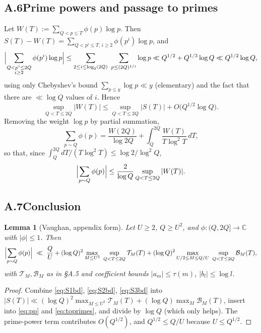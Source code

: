 \documentclass[11pt]{article}
\newtheorem{lemma}[theorem]{Lemma}
\theoremstyle{definition}
\theoremstyle{plain}
\begin{document}
\subsection*{A.6\quad Prime powers and passage to primes}

Let $W(T):=\sum_{Q<p\le T}\phi(p)\log p$.  Then
$S(T)-W(T)=\sum_{Q<p^{i}\le T,\,i\ge2}\phi(p^{i})\log p$, and
\[
\Bigl|\sum_{\substack{Q<p^{i}\le2Q\\ i\ge2}}\phi(p^{i})\log p\Bigr|
\le\sum_{2\le i\le\log_{2}(2Q)}\ \sum_{p\le(2Q)^{1/i}}\log p
\ll Q^{1/2}+Q^{1/3}\log Q\ll Q^{1/2}\log Q ,
\]
using only Chebyshev's bound $\sum_{p\le y}\log p\ll y$ (elementary) and
the fact that there are $\ll\log Q$ values of $i$.  Hence
\begin{equation}\label{eq:pp}
\sup_{Q<T\le2Q}|W(T)|\le\sup_{Q<T\le2Q}|S(T)|+O\bigl(Q^{1/2}\log Q\bigr).
\end{equation}
Removing the weight $\log p$ by partial summation,
\[
\sum_{p\sim Q}\phi(p)=\frac{W(2Q)}{\log 2Q}
+\int_{Q}^{2Q}\frac{W(T)}{T\log^{2}T}\,dT ,
\]
so that, since $\int_{Q}^{2Q}dT/(T\log^{2}T)\le\log2/\log^{2}Q$,
\begin{equation}\label{eq:toprimes}
\Bigl|\sum_{p\sim Q}\phi(p)\Bigr|
\le\frac{2}{\log Q}\sup_{Q<T\le2Q}|W(T)| .
\end{equation}

\subsection*{A.7\quad Conclusion}

\begin{lemma}[Vaughan, appendix form]\label{lem:vaughanA}
Let $U\ge2$, $Q\ge U^{2}$, and $\phi:(Q,2Q]\to\mathbb C$ with
$|\phi|\le1$.  Then
\[
\Bigl|\sum_{p\sim Q}\phi(p)\Bigr|
\ \ll\ \frac{Q}{U}
+(\log Q)^{2}\max_{M\le U^{2}}\ \sup_{Q<T\le2Q}\mathcal T_{M}(T)
+(\log Q)^{2}\max_{U/2\le M\le Q/U}\ \sup_{Q<T\le2Q}\mathcal B_{M}(T),
\]
with $\mathcal T_{M},\mathcal B_{M}$ as in \S A.5 and coefficient bounds
$|a_{m}|\le\tau(m)$, $|b_{l}|\le\log l$.
\end{lemma}

\begin{proof}
Combine \eqref{eq:S1bd}, \eqref{eq:S2bd}, \eqref{eq:S3bd} into
$|S(T)|\ll(\log Q)^{2}\max_{M\le U^{2}}\mathcal T_{M}(T)
+(\log Q)\max_{M}\mathcal B_{M}(T)$, insert into \eqref{eq:pp} and
\eqref{eq:toprimes}, and divide by $\log Q$ (which only helps).  The
prime-power term contributes $O(Q^{1/2})$, and $Q^{1/2}\le Q/U$ because
$U\le Q^{1/2}$.
\end{proof}
\end{document}
